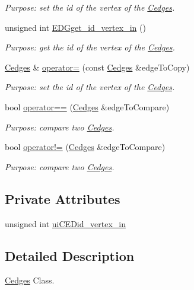 \begin{DoxyCompactItemize}
\begin{DoxyCompactList}\small\item\em Purpose\+: set the id of the vertex of the \hyperlink{class_cedges}{Cedges}. \end{DoxyCompactList}\item 
unsigned int \hyperlink{class_cedges_aac42f7a6ee61364b34e8c91340b899fb}{E\+D\+Gget\+\_\+id\+\_\+vertex\+\_\+in} ()
\begin{DoxyCompactList}\small\item\em Purpose\+: get the id of the vertex of the \hyperlink{class_cedges}{Cedges}. \end{DoxyCompactList}\item 
\hyperlink{class_cedges}{Cedges} \& \hyperlink{class_cedges_a82ca99bf0490afb89141073bfa8f5c7b}{operator=} (const \hyperlink{class_cedges}{Cedges} \&edge\+To\+Copy)
\begin{DoxyCompactList}\small\item\em Purpose\+: set the id of the vertex of the \hyperlink{class_cedges}{Cedges}. \end{DoxyCompactList}\item 
bool \hyperlink{class_cedges_ab4fdab8847fe895c3975237624f1c870}{operator==} (\hyperlink{class_cedges}{Cedges} \&edge\+To\+Compare)
\begin{DoxyCompactList}\small\item\em Purpose\+: compare two \hyperlink{class_cedges}{Cedges}. \end{DoxyCompactList}\item 
bool \hyperlink{class_cedges_a00094fb7a37c470d0036b6d8d83a8f70}{operator!=} (\hyperlink{class_cedges}{Cedges} \&edge\+To\+Compare)
\begin{DoxyCompactList}\small\item\em Purpose\+: compare two \hyperlink{class_cedges}{Cedges}. \end{DoxyCompactList}\end{DoxyCompactItemize}
\subsection*{Private Attributes}
\begin{DoxyCompactItemize}
\item 
unsigned int \hyperlink{class_cedges_ad9442a3d65633ebf622aa0623f61bfba}{ui\+C\+E\+Did\+\_\+vertex\+\_\+in}
\end{DoxyCompactItemize}


\subsection{Detailed Description}
\hyperlink{class_cedges}{Cedges} Class. 

